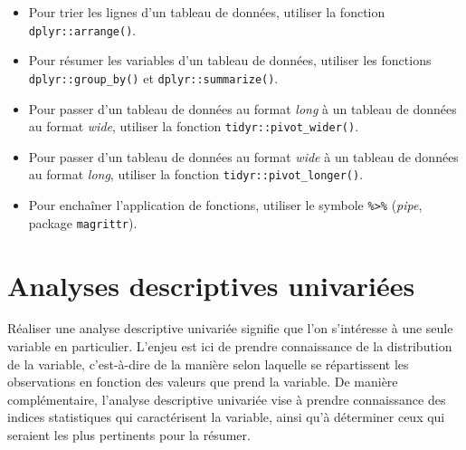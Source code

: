 \documentclass[
  french,
]{book}
\begin{document}
\begin{itemize}
\item
  Pour trier les lignes d'un tableau de données, utiliser la fonction \texttt{dplyr::arrange()}.
\item
  Pour résumer les variables d'un tableau de données, utiliser les fonctions \texttt{dplyr::group\_by()} et \texttt{dplyr::summarize()}.
\item
  Pour passer d'un tableau de données au format \emph{long} à un tableau de données au format \emph{wide}, utiliser la fonction \texttt{tidyr::pivot\_wider()}.
\item
  Pour passer d'un tableau de données au format \emph{wide} à un tableau de données au format \emph{long}, utiliser la fonction \texttt{tidyr::pivot\_longer()}.
\item
  Pour enchaîner l'application de fonctions, utiliser le symbole \texttt{\%\textgreater{}\%} (\emph{pipe}, package \texttt{magrittr}).
\end{itemize}

\hypertarget{analyses-descriptives-univariuxe9es}{%
\chapter{Analyses descriptives univariées}\label{analyses-descriptives-univariuxe9es}}

Réaliser une analyse descriptive univariée signifie que l'on s'intéresse à une seule variable en particulier. L'enjeu est ici de prendre connaissance de la distribution de la variable, c'est-à-dire de la manière selon laquelle se répartissent les observations en fonction des valeurs que prend la variable. De manière complémentaire, l'analyse descriptive univariée vise à prendre connaissance des indices statistiques qui caractérisent la variable, ainsi qu'à déterminer ceux qui seraient les plus pertinents pour la résumer.
\end{document}

